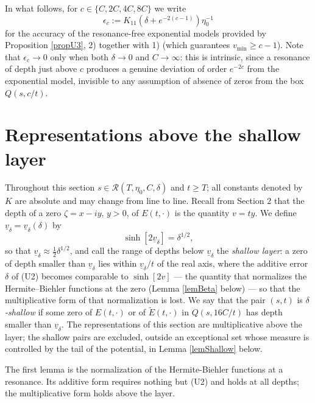 \documentclass[11pt,twoside,reqno]{amsart}
\def\ti{\tilde}
\def\to{\rightarrow}
\def\RR{{\mathcal{R}}}
\def\d{\delta}
\def\uv{\underline{v}_{\d}}
\theoremstyle{plain}
\numberwithin{equation}{section}
\begin{document}
In what follows, for $c\in\{C,2C,4C,8C\}$ we write
\begin{equation}
\epsilon_c:=K_{11}\left(\d+e^{-2(c-1)}\right)\eta_0^{-1}
\label{eqEpsU3}
\end{equation}
for the accuracy of the resonance-free exponential models provided by Proposition \ref{propU3}, 2) together with 1) (which guarantees $v_{\min}\geq c-1$). Note that $\epsilon_c\to0$ only when both $\d\to0$ and $C\to\infty$: this is intrinsic, since a resonance of depth just above $c$ produces a genuine deviation of order $e^{-2c}$ from the exponential model, invisible to any assumption of absence of zeros from the box $Q(s,c/t)$.

\section{Representations above the shallow layer}\label{secRep}

Throughout this section $s\in\RR(T,\eta_0,C,\d)$ and $t\geq T$; all constants denoted by $K$ are absolute and may change from line to line. Recall from Section 2 that the depth of a zero $\zeta=x-iy$, $y>0$, of $E(t,\cdot)$ is the quantity $v=ty$. We define $\uv=\uv(\d)$ by
\begin{equation}
\sinh[2\uv]=\d^{1/2},
\label{eqLayer}
\end{equation}
so that $\uv\approx\tfrac12\d^{1/2}$, and call the range of depths below $\uv$ the {\it shallow layer}: a zero of depth smaller than $\uv$ lies within $\uv/t$ of the real axis, where the additive error $\d$ of (U2) becomes comparable to $\sinh[2v]$ --- the quantity that normalizes the Hermite--Biehler functions at the zero (Lemma \ref{lemBeta} below) --- so that the multiplicative form of that normalization is lost. We say that the pair $(s,t)$ is {\it $\d$-shallow} if some zero of $E(t,\cdot)$ or of $\ti E(t,\cdot)$ in $Q(s,16C/t)$ has depth smaller than $\uv$. The representations of this section are multiplicative above the layer; the shallow pairs are excluded, outside an exceptional set whose measure is controlled by the tail of the potential, in Lemma \ref{lemShallow} below.

The first lemma is the normalization of the Hermite-Biehler functions at a resonance. Its additive form requires nothing but (U2) and holds at all depths; the multiplicative form holds above the layer.
\end{document}
